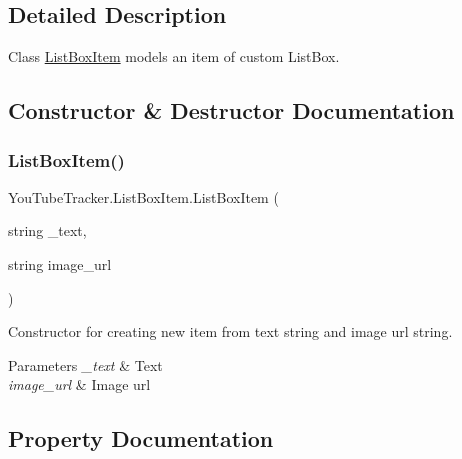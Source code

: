 \subsection{Detailed Description}
Class {\ttfamily \mbox{\hyperlink{class_you_tube_tracker_1_1_list_box_item}{List\+Box\+Item}}} models an item of custom List\+Box. 



\subsection{Constructor \& Destructor Documentation}
\mbox{\label{class_you_tube_tracker_1_1_list_box_item_a4e0b02f68b5fa2dcb2e9181897f72495}} 
\subsubsection{\texorpdfstring{List\+Box\+Item()}{ListBoxItem()}}
{\footnotesize\ttfamily You\+Tube\+Tracker.\+List\+Box\+Item.\+List\+Box\+Item (\begin{DoxyParamCaption}\item[{string}]{\+\_\+text,  }\item[{string}]{image\+\_\+url }\end{DoxyParamCaption})\hspace{0.3cm}{\ttfamily [inline]}}



Constructor for creating new item from text string and image url string. 


\begin{DoxyParams}{Parameters}
{\em \+\_\+text} & Text\\
\hline
{\em image\+\_\+url} & Image url\\
\hline
\end{DoxyParams}


\subsection{Property Documentation}
\mbox{\label{class_you_tube_tracker_1_1_list_box_item_acb47893bd730bdc88d79198bbfd0b9bb}} 
